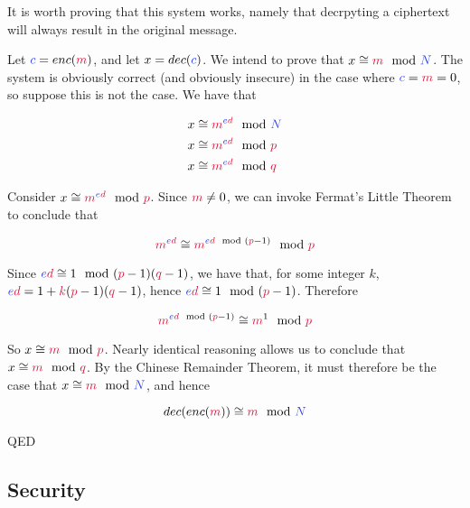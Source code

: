 	It is worth proving that this system works, namely that decrpyting a ciphertext will always result in the original message.

	\vspace{5mm}
	
	Let $\cc = enc(\cm)$, and let $x = dec(\cc)$. We intend to prove that $x \cong \cm \mod \cN$. The system is obviously correct (and obviously insecure) in the case where $\cc=\cm=0$, so suppose this is not the case. We have that
	
	\begin{align*}
	    x &\cong \cm^{\ce\cd} \mod \cN\\
	    x &\cong \cm^{\ce\cd} \mod \cp\\
	    x &\cong \cm^{\ce\cd} \mod \cq
	\end{align*}
	
	Consider $x \cong \cm^{\ce \cd} \mod \cp$. Since $\cm \neq 0$, we can invoke Fermat's Little Theorem to conclude that
	
	$$
	    \cm^{\ce\cd} \cong \cm^{\ce\cd \mod (\cp-1)} \mod \cp
	$$
	
	Since $\ce\cd \cong 1 \mod (\cp-1)(\cq-1)$, we have that, for some integer $k$, $\ce\cd = 1 + \ck(\cp-1)(\cq-1)$, hence $\ce\cd \cong 1 \mod (\cp-1)$. Therefore
	
	$$
	    \cm^{\ce\cd \mod (\cp-1)}\cong \cm^1 \mod \cp
	$$
	
	So $x \cong \cm \mod \cp$. Nearly identical reasoning allows us to conclude that $x \cong \cm \mod \cq$. By the Chinese Remainder Theorem, it must therefore be the case that $x \cong \cm \mod \cN$, and hence
	
	$$
	    dec(enc(\cm)) \cong \cm \mod \cN 
	$$
	
	\begin{flushright}
	QED
	\end{flushright}
	\subsection{Security}

